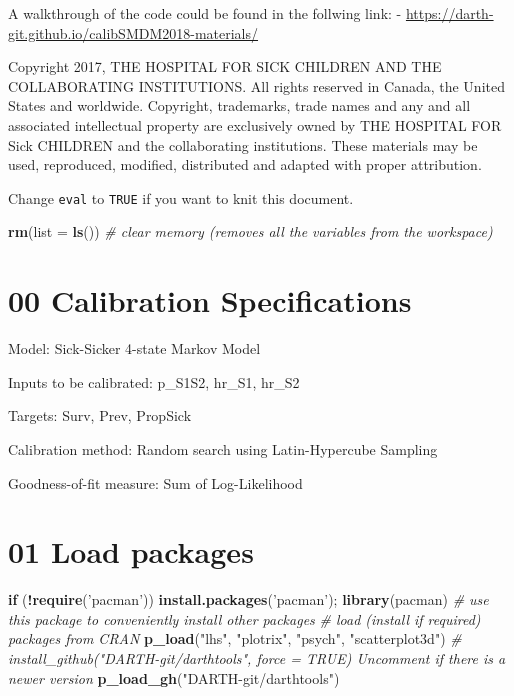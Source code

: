 \documentclass[
]{article}
\newenvironment{Shaded}{\begin{snugshade}}{\end{snugshade}}
\newcommand{\CommentTok}[1]{\textcolor[rgb]{0.56,0.35,0.01}{\textit{#1}}}
\newcommand{\ControlFlowTok}[1]{\textcolor[rgb]{0.13,0.29,0.53}{\textbf{#1}}}
\newcommand{\DataTypeTok}[1]{\textcolor[rgb]{0.13,0.29,0.53}{#1}}
\newcommand{\KeywordTok}[1]{\textcolor[rgb]{0.13,0.29,0.53}{\textbf{#1}}}
\newcommand{\NormalTok}[1]{#1}
\newcommand{\OperatorTok}[1]{\textcolor[rgb]{0.81,0.36,0.00}{\textbf{#1}}}
\newcommand{\StringTok}[1]{\textcolor[rgb]{0.31,0.60,0.02}{#1}}
\begin{document}
A walkthrough of the code could be found in the follwing link: -
\url{https://darth-git.github.io/calibSMDM2018-materials/}

Copyright 2017, THE HOSPITAL FOR SICK CHILDREN AND THE COLLABORATING
INSTITUTIONS. All rights reserved in Canada, the United States and
worldwide. Copyright, trademarks, trade names and any and all associated
intellectual property are exclusively owned by THE HOSPITAL FOR Sick
CHILDREN and the collaborating institutions. These materials may be
used, reproduced, modified, distributed and adapted with proper
attribution.

\newpage

Change \texttt{eval} to \texttt{TRUE} if you want to knit this document.

\begin{Shaded}
\begin{Highlighting}[]
\KeywordTok{rm}\NormalTok{(}\DataTypeTok{list =} \KeywordTok{ls}\NormalTok{())      }\CommentTok{# clear memory (removes all the variables from the workspace)}
\end{Highlighting}
\end{Shaded}

\hypertarget{calibration-specifications}{%
\section{00 Calibration
Specifications}\label{calibration-specifications}}

Model: Sick-Sicker 4-state Markov Model

Inputs to be calibrated: p\_S1S2, hr\_S1, hr\_S2

Targets: Surv, Prev, PropSick

Calibration method: Random search using Latin-Hypercube Sampling

Goodness-of-fit measure: Sum of Log-Likelihood

\hypertarget{load-packages}{%
\section{01 Load packages}\label{load-packages}}

\begin{Shaded}
\begin{Highlighting}[]
\ControlFlowTok{if}\NormalTok{ (}\OperatorTok{!}\KeywordTok{require}\NormalTok{(}\StringTok{'pacman'}\NormalTok{)) }\KeywordTok{install.packages}\NormalTok{(}\StringTok{'pacman'}\NormalTok{); }\KeywordTok{library}\NormalTok{(pacman) }\CommentTok{# use this package to conveniently install other packages}
\CommentTok{# load (install if required) packages from CRAN}
\KeywordTok{p_load}\NormalTok{(}\StringTok{"lhs"}\NormalTok{, }\StringTok{"plotrix"}\NormalTok{, }\StringTok{"psych"}\NormalTok{, }\StringTok{"scatterplot3d"}\NormalTok{)  }
\CommentTok{# install_github("DARTH-git/darthtools", force = TRUE) Uncomment if there is a newer version}
\KeywordTok{p_load_gh}\NormalTok{(}\StringTok{"DARTH-git/darthtools"}\NormalTok{)}
\end{Highlighting}
\end{Shaded}
\end{document}
